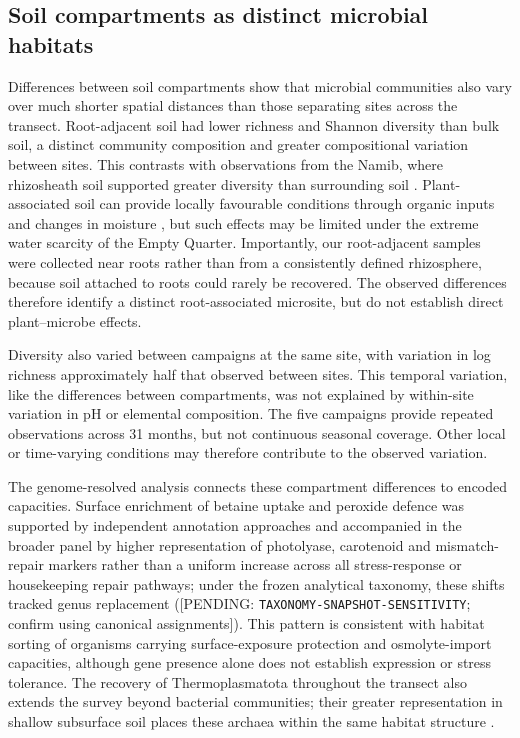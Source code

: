 \documentclass[fleqn,10pt,numbers]{olplainarticle}
\begin{document}
\subsection*{Soil compartments as distinct microbial habitats}
Differences between soil compartments show that microbial communities also vary over much shorter spatial distances than those separating sites across the transect. Root-adjacent soil had lower richness and Shannon diversity than bulk soil, a distinct community composition and greater compositional variation between sites. This contrasts with observations from the Namib, where rhizosheath soil supported greater diversity than surrounding soil \cite{marasco2022namib}. Plant-associated soil can provide locally favourable conditions through organic inputs and changes in moisture \cite{marasco2022namib}, but such effects may be limited under the extreme water scarcity of the Empty Quarter. Importantly, our root-adjacent samples were collected near roots rather than from a consistently defined rhizosphere, because soil attached to roots could rarely be recovered. The observed differences therefore identify a distinct root-associated microsite, but do not establish direct plant–microbe effects.

Diversity also varied between campaigns at the same site, with variation in log richness approximately half that observed between sites. This temporal variation, like the differences between compartments, was not explained by within-site variation in pH or elemental composition. The five campaigns provide repeated observations across 31 months, but not continuous seasonal coverage. Other local or time-varying conditions may therefore contribute to the observed variation.

The genome-resolved analysis connects these compartment differences to encoded capacities. Surface enrichment of betaine uptake and peroxide defence was supported by independent annotation approaches and accompanied in the broader panel by higher representation of photolyase, carotenoid and mismatch-repair markers rather than a uniform increase across all stress-response or housekeeping repair pathways; under the frozen analytical taxonomy, these shifts tracked genus replacement ([PENDING: \texttt{TAXONOMY-\allowbreak SNAPSHOT-\allowbreak SENSITIVITY}; confirm using canonical assignments]). This pattern is consistent with habitat sorting of organisms carrying surface-exposure protection and osmolyte-import capacities, although gene presence alone does not establish expression or stress tolerance. The recovery of Thermoplasmatota throughout the transect also extends the survey beyond bacterial communities; their greater representation in shallow subsurface soil places these archaea within the same habitat structure \cite{proteome_companion}.
\end{document}
